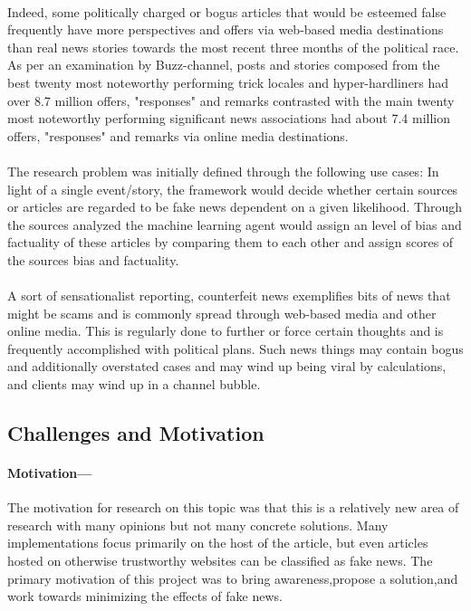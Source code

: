 \documentclass[11.5pt]{article}
\begin{document}
\begin{multicols}{2}
\paragraph{}
Indeed, some politically charged or bogus articles that would be esteemed false frequently have more perspectives and offers via web-based media destinations than real news stories towards the most recent three months of the political race. As per an examination by Buzz-channel, posts and stories composed from the best twenty most noteworthy performing trick locales and hyper-hardliners had over 8.7 million offers, "responses" and remarks contrasted with the main twenty most noteworthy performing significant news associations had about 7.4 million offers, "responses" and remarks via online media destinations.

\paragraph{}
The research problem was initially deﬁned through the following use cases: In light of a single event/story, the framework would decide whether certain sources or articles are regarded to be fake news dependent on a given likelihood. Through the sources analyzed the machine learning agent would assign an level of bias and factuality of these articles by comparing them to each other and assign scores of the sources bias and factuality.

\paragraph{}
A sort of sensationalist reporting, counterfeit news exemplifies bits of news that might be scams and is commonly spread through web-based media and other online media. This is regularly done to further or force certain thoughts and is frequently accomplished with political plans. Such news things may contain bogus and additionally overstated cases and may wind up being viral by calculations, and clients may wind up in a channel bubble.

\subsection{Challenges and Motivation}
\paragraph{Motivation---}
The motivation for research on this topic was that this is a relatively new area of research with many opinions but not many concrete solutions. Many implementations focus primarily on the host of the article, but even articles hosted on otherwise trustworthy websites can be classiﬁed as fake news. The primary motivation of this project was to bring awareness,propose a solution,and work towards minimizing the effects of fake news.


\end{multicols}
\end{document}
